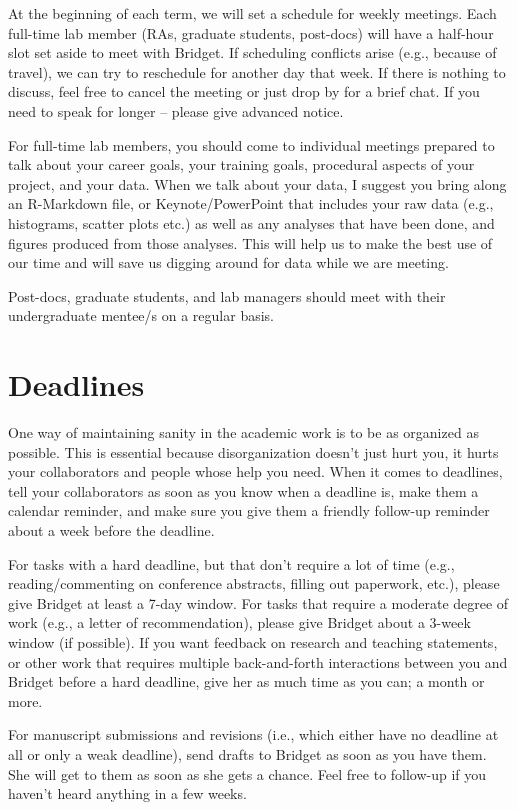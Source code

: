 \documentclass[]{book}
\begin{document}
At the beginning of each term, we will set a schedule for weekly meetings. Each full-time lab member (RAs, graduate students, post-docs) will have a half-hour slot set aside to meet with Bridget. If scheduling conflicts arise (e.g., because of travel), we can try to reschedule for another day that week. If there is nothing to discuss, feel free to cancel the meeting or just drop by for a brief chat. If you need to speak for longer -- please give advanced notice.

For full-time lab members, you should come to individual meetings prepared to talk about your career goals, your training goals, procedural aspects of your project, and your data. When we talk about your data, I suggest you bring along an R-Markdown file, or Keynote/PowerPoint that includes your raw data (e.g., histograms, scatter plots etc.) as well as any analyses that have been done, and figures produced from those analyses. This will help us to make the best use of our time and will save us digging around for data while we are meeting.

Post-docs, graduate students, and lab managers should meet with their undergraduate mentee/s on a regular basis.

\hypertarget{deadlines}{%
\section{Deadlines}\label{deadlines}}

One way of maintaining sanity in the academic work is to be as organized as possible. This is essential because disorganization doesn't just hurt you, it hurts your collaborators and people whose help you need. When it comes to deadlines, tell your collaborators as soon as you know when a deadline is, make them a calendar reminder, and make sure you give them a friendly follow-up reminder about a week before the deadline.

For tasks with a hard deadline, but that don't require a lot of time (e.g., reading/commenting on conference abstracts, filling out paperwork, etc.), please give Bridget at least a 7-day window. For tasks that require a moderate degree of work (e.g., a letter of recommendation), please give Bridget about a 3-week window (if possible). If you want feedback on research and teaching statements, or other work that requires multiple back-and-forth interactions between you and Bridget before a hard deadline, give her as much time as you can; a month or more.

For manuscript submissions and revisions (i.e., which either have no deadline at all or only a weak deadline), send drafts to Bridget as soon as you have them. She will get to them as soon as she gets a chance. Feel free to follow-up if you haven't heard anything in a few weeks.
\end{document}
